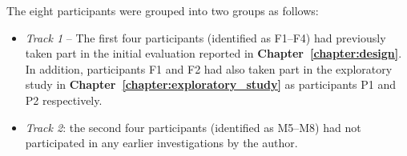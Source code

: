 The eight participants were grouped into two groups as follows:
\begin{itemize}
\item \textit{Track 1} -- The first four participants (identified as F1--F4) had previously taken part in the 
initial evaluation reported in \textbf{Chapter~\ref{chapter:design}}.  In addition, participants F1 and F2 had also taken part in the exploratory study in \textbf{Chapter~\ref{chapter:exploratory_study}} as participants P1 and P2 respectively.
  
\item \textit{Track 2}: the second four participants (identified as M5--M8) had not participated in any earlier investigations by the author.
\end{itemize}






